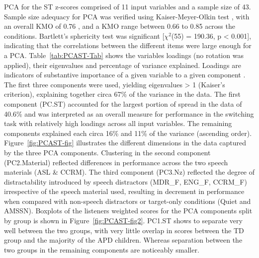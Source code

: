 \documentclass[a4paper, twoside]{templates/ociamthesis}
\begin{document}
PCA for the ST z-scores comprised of 11 input variables and a sample size of 43. Sample size adequacy for PCA was verified using Kaiser-Meyer-Olkin test \autocite[psych::KMO;][]{psychPackageR}, with an overall KMO of 0.76 \autocite[`good';][]{Field2012Chpt17}, and a KMO range between 0.66 to 0.85 across the conditions. Bartlett's sphericity test was significant {[}\(\chi^2\)(55) = 190.36, p \textless{} 0.001{]}, indicating that the correlations between the different items were large enough for a PCA. Table~\ref{tab:PCAST-Tab} shows the variables loadings (no rotation was applied), their eigenvalues and percentage of variance explained. Loadings are indicators of substantive importance of a given variable to a given component \autocite{Field2012Chpt17}. The first three components were used, yielding eigenvalues \textgreater{} 1 (Kaiser's criterion), explaining together circa 67\% of the variance in the data. The first component (PC.ST) accounted for the largest portion of spread in the data of 40.6\% and was interpreted as an overall measure for performance in the switching task with relatively high loadings across all input variables. The remaining components explained each circa 16\% and 11\% of the variance (ascending order). Figure~\ref{fig:PCAST-fig} illustrates the different dimensions in the data captured by the three PCA components. Clustering in the second component (PC2.Material) reflected differences in performance across the two speech materials (ASL \& CCRM). The third component (PC3.Nz) reflected the degree of distractability introduced by speech distractors (MDR\_F, ENG\_F, CCRM\_F) irrespective of the speech material used, resulting in decrement in performance when compared with non-speech distractors or target-only conditions (Quiet and AMSSN). Boxplots of the listeners weighted scores for the PCA components split by group is shown in Figure~\ref{fig:PCAST-fig2}. PC1.ST shows to separate very well between the two groups, with very little overlap in scores between the TD group and the majority of the APD children. Whereas separation between the two groups in the remaining components are noticeably smaller.\\
\end{document}

